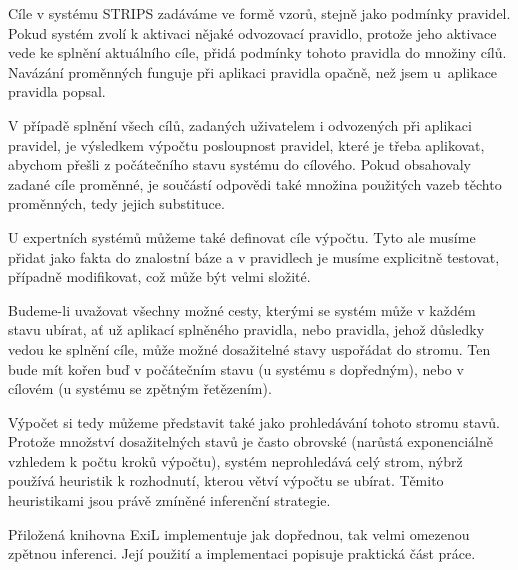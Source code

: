 Cíle v systému STRIPS zadáváme ve formě vzorů, stejně jako podmínky pravidel.
Pokud systém zvolí k aktivaci nějaké odvozovací pravidlo, protože jeho aktivace
vede ke splnění aktuálního cíle, přidá podmínky tohoto pravidla do množiny
cílů. Navázání proměnných funguje při aplikaci pravidla opačně, než jsem
u~aplikace pravidla popsal.

V případě splnění všech cílů, zadaných uživatelem i odvozených při aplikaci
pravidel, je výsledkem výpočtu posloupnost pravidel, které je třeba aplikovat,
abychom přešli z počátečního stavu systému do cílového. Pokud obsahovaly zadané
cíle proměnné, je součástí odpovědi také množina použitých vazeb těchto
proměnných, tedy jejich substituce.

U expertních systémů můžeme také definovat cíle výpočtu. Tyto ale musíme přidat
jako fakta do znalostní báze a v pravidlech je musíme explicitně testovat,
případně modifikovat, což může být velmi složité.

Budeme-li uvažovat všechny možné cesty, kterými se systém může v každém stavu
ubírat, ať už aplikací splněného pravidla, nebo pravidla, jehož důsledky vedou
ke splnění cíle, může možné dosažitelné stavy uspořádat do stromu. Ten bude mít
kořen buď v počátečním stavu (u systému s dopředným), nebo v cílovém (u systému
se zpětným řetězením).

Výpočet si tedy můžeme představit také jako prohledávání tohoto stromu stavů.
Protože množství dosažitelných stavů je často obrovské (narůstá exponenciálně
vzhledem k počtu kroků výpočtu), systém neprohledává celý strom, nýbrž používá
heuristik k rozhodnutí, kterou větví výpočtu se ubírat.  Těmito heuristikami
jsou právě zmíněné inferenční strategie.

Přiložená knihovna ExiL implementuje jak dopřednou, tak velmi omezenou zpětnou
inferenci. Její použití a implementaci popisuje praktická část práce.
